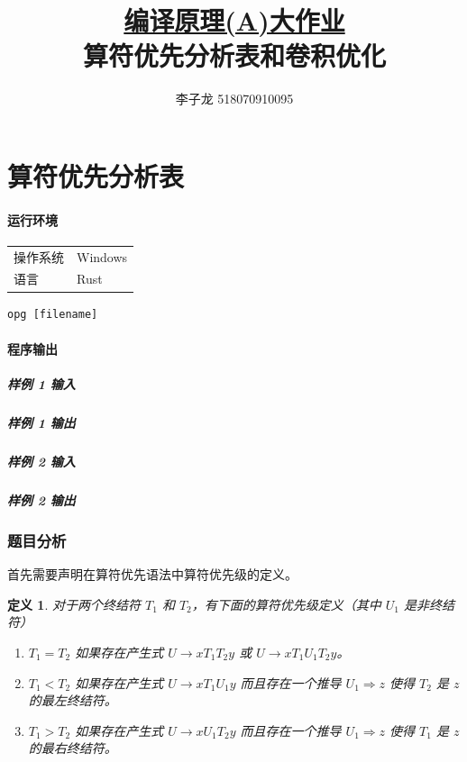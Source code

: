 \documentclass[UTF8]{ctexart}
\title{\normalsize\underline{编译原理(A)大作业}\\\Large 算符优先分析表和卷积优化}
\author{李子龙 518070910095}
\newtheorem{definition}{定义}
\begin{document}
    \maketitle 
    \tableofcontents
    \clearpage

\part{算符优先分析表}
\subsection*{运行环境}
\begin{tabular}{ll}
    操作系统 & Windows \\
    语言 & Rust\cite{SteveKlabnik2019} \\
\end{tabular}
\vspace*{1em}
\begin{lstlisting}[frameround=fttt]
    opg [filename]
\end{lstlisting}
\subsection*{程序输出}
\subsubsection*{样例 1 输入}

\subsubsection*{样例 1 输出}

\subsubsection*{样例 2 输入}

\subsubsection*{样例 2 输出}


\section{题目分析}

首先需要声明在算符优先语法中算符优先级的定义\cite{Floyd1963}。
\begin{definition}\label{def:op}
    对于两个终结符 $T_1$ 和 $T_2$，有下面的算符优先级定义（其中 $U_1$ 是非终结符）
    \begin{enumerate}
        \item $T_1=T_2$ 如果存在产生式 $U\rightarrow xT_1T_2y$ 或 $U\rightarrow xT_1 U_1 T_2 y$。
        \item $T_1<T_2$ 如果存在产生式 $U\rightarrow xT_1U_1y$ 而且存在一个推导 $U_1\Rightarrow z$ 使得 $T_2$ 是 $z$ 的最左终结符。
        \item $T_1>T_2$ 如果存在产生式 $U\rightarrow xU_1T_2y$ 而且存在一个推导 $U_1\Rightarrow z$ 使得 $T_1$ 是 $z$ 的最右终结符。
    \end{enumerate}
\end{definition}
\end{document}
